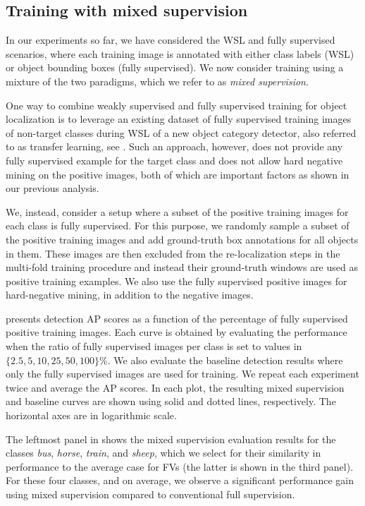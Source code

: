 \documentclass[10pt,journal,cspaper,final,twocolumn,compsoc]{./IEEEtran}
\begin{document}
\subsection{Training with mixed supervision}\label{sec:mixedsupervision}

In our experiments so far, we have considered the WSL and
fully supervised scenarios, where each training image is
annotated with either class labels (WSL) or object
bounding boxes (fully supervised). We now consider
training using a mixture of the two paradigms, which we
refer to as {\em mixed supervision}.

One way to combine weakly supervised and fully supervised
training for object localization is to leverage an
existing dataset of fully supervised training images of
non-target classes during WSL of a new object category
detector, also referred to as transfer learning, see \eg\cite{deselaers12ijcv,shi12bmvc}. Such an approach,
however, does not provide any fully supervised example for
the target class and does not allow hard negative mining
on the positive images, both of which are important
factors as shown in our previous analysis.

We, instead, consider a  setup where a
subset of the positive training images for each class is
fully supervised. For this purpose, we randomly sample a
subset of the positive training images and add
ground-truth box annotations for all objects in them.
These images are then excluded from the re-localization
steps in the multi-fold training procedure and instead their
ground-truth windows are used as
positive training examples. We also use the fully supervised
positive images for hard-negative mining, in addition to the negative images.

 presents detection AP scores as a
function of the percentage of fully supervised positive
training images. Each curve is obtained by evaluating the
performance when the ratio of
fully supervised images per class is set to values in $\{2.5,5,10,25,50,100\}\%$.
We also evaluate the baseline detection
results where only the fully supervised images are used
for training.  We repeat each experiment twice and average
the AP scores.  In each plot, the resulting mixed supervision and 
baseline curves are shown using solid and dotted lines,
respectively. The  horizontal axes are in logarithmic scale.

The leftmost panel in  shows the
mixed supervision evaluation results for the classes
{\em bus}, {\em horse}, {\em train}, and {\em sheep},
which we select for their similarity in performance to 
the average case for FVs (the latter is shown in the third panel). 
For these four classes, and on average, we observe a significant
performance gain using mixed supervision compared to
conventional full supervision. %
\end{document}
